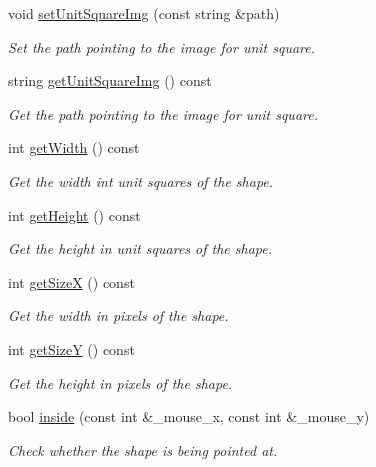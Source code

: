 \begin{DoxyCompactItemize}
void \mbox{\hyperlink{class_shape_a0d022da031906acd13be90c3fb3db643}{set\+Unit\+Square\+Img}} (const string \&path)
\begin{DoxyCompactList}\small\item\em Set the path pointing to the image for unit square. \end{DoxyCompactList}\item 
string \mbox{\hyperlink{class_shape_a392209d780a35dbf8e2311ce02121bde}{get\+Unit\+Square\+Img}} () const
\begin{DoxyCompactList}\small\item\em Get the path pointing to the image for unit square. \end{DoxyCompactList}\item 
int \mbox{\hyperlink{class_shape_a26c64aa551ac8d6d625ee74237157045}{get\+Width}} () const
\begin{DoxyCompactList}\small\item\em Get the width int unit squares of the shape. \end{DoxyCompactList}\item 
int \mbox{\hyperlink{class_shape_ad81db3946b35eaeb9dcfbaaacb65c5f8}{get\+Height}} () const
\begin{DoxyCompactList}\small\item\em Get the height in unit squares of the shape. \end{DoxyCompactList}\item 
int \mbox{\hyperlink{class_shape_ab01274fed67639da2080f73db0fc8f20}{get\+SizeX}} () const
\begin{DoxyCompactList}\small\item\em Get the width in pixels of the shape. \end{DoxyCompactList}\item 
int \mbox{\hyperlink{class_shape_a487dee28fa84cab6282eb16a95f91c68}{get\+SizeY}} () const
\begin{DoxyCompactList}\small\item\em Get the height in pixels of the shape. \end{DoxyCompactList}\item 
bool \mbox{\hyperlink{class_shape_a4c01d871d08fae8b9ab27fa808f8056a}{inside}} (const int \&\+\_\+mouse\+\_\+x, const int \&\+\_\+mouse\+\_\+y)
\begin{DoxyCompactList}\small\item\em Check whether the shape is being pointed at. \end{DoxyCompactList}\item 

\end{DoxyCompactItemize}
